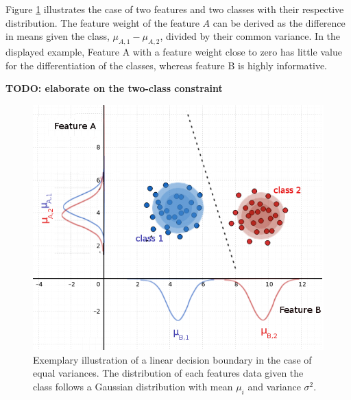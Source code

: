 \documentclass[a4paper, 12pt]{scrreprt}
\begin{document}
Figure \ref{GNB} illustrates the case of two features and two classes with their respective distribution. The feature weight of the feature $A$ can be derived as the difference in means given the class, $\mu_{A, 1} - \mu_{A, 2}$, divided by their common variance. In the displayed example, Feature A with a feature weight close to zero has little value for the differentiation of the classes, whereas feature B is highly informative. \newline


\textbf{TODO: elaborate on the two-class constraint}

\begin{figure}[H]
	\includegraphics[scale=0.5]{img/improved_GNB.png}
	\caption[A linear decision boundery for a linear Gaussian Naive Bayes classifier]{\small{Exemplary illustration of a linear decision boundary in the case of equal variances. The distribution of each features data given the class follows a Gaussian distribution with mean $\mu_i$ and variance $\sigma^2$.}}
	\label{GNB}
\end{figure}
	
\end{document}
